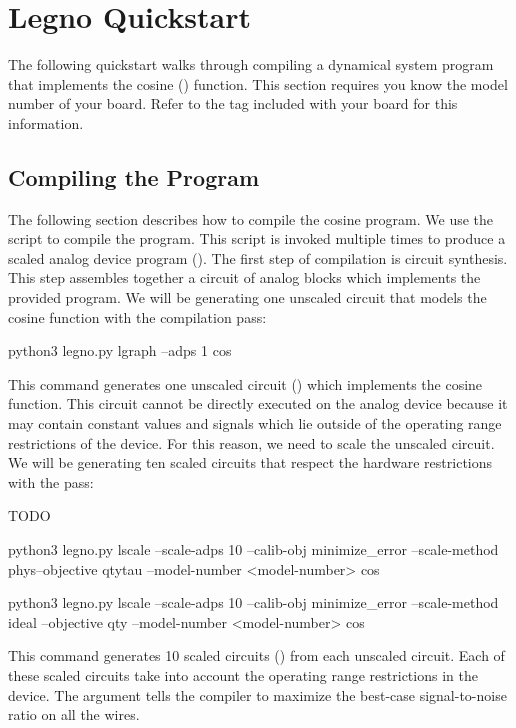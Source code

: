 \chapter{Legno Quickstart}

The following quickstart walks through compiling a dynamical system program that
implements the cosine () function. This section requires you know the
model number of your board. Refer to the tag included with your board for this
information.


\section{Compiling the  Program}

The following section describes how to compile the cosine program. We use the
 script to compile the program. This script  is invoked multiple
times to produce a scaled analog device program (). The first step of
compilation is circuit synthesis. This step assembles together a circuit of
analog blocks which implements the provided program. We will be generating one
unscaled circuit that models the cosine function with the 
compilation pass:

\begin{snippet}
  python3 legno.py lgraph --adps 1 cos
\end{snippet}

This command generates one unscaled circuit () which implements
the cosine function. This circuit cannot be directly executed on the analog
device because it may contain constant values and signals which lie outside of
the operating range restrictions of the device. For this reason, we need to
scale the unscaled circuit. We will be generating ten scaled circuits that
respect the hardware restrictions with the  pass:

TODO 
\begin{snippet}
  python3 legno.py lscale --scale-adps 10 --calib-obj minimize_error
  --scale-method phys--objective qtytau --model-number <model-number> cos
\end{snippet}


\begin{snippet}
  python3 legno.py lscale --scale-adps 10 --calib-obj minimize_error
  --scale-method ideal --objective qty --model-number <model-number> cos
\end{snippet}

This command generates 10 scaled circuits () from each
unscaled circuit. Each of these scaled circuits take into account the operating
range restrictions in the device. The  argument tells the
compiler to maximize the best-case signal-to-noise ratio on all the wires.

